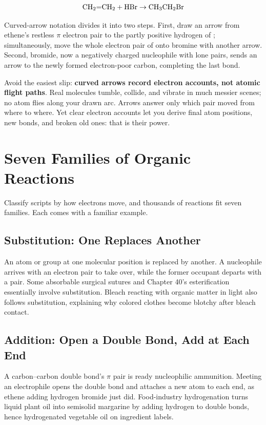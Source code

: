 \[\mathrm{CH_2{=}CH_2} + \mathrm{HBr} \rightarrow \mathrm{CH_3CH_2Br}\]

Curved-arrow notation divides it into two steps. First, draw an arrow from ethene's restless $\pi$ electron pair to the partly positive hydrogen of ; simultaneously, move the whole electron pair of  onto bromine with another arrow. Second, bromide, now a negatively charged nucleophile with lone pairs, sends an arrow to the newly formed electron-poor carbon, completing the last bond.

Avoid the easiest slip: \textbf{curved arrows record electron accounts, not atomic flight paths}. Real molecules tumble, collide, and vibrate in much messier scenes; no atom flies along your drawn arc. Arrows answer only which pair moved from where to where. Yet clear electron accounts let you derive final atom positions, new bonds, and broken old ones: that is their power.

\section{Seven Families of Organic Reactions}

Classify scripts by how electrons move, and thousands of reactions fit seven families. Each comes with a familiar example.

\subsection{Substitution: One Replaces Another}

An atom or group at one molecular position is replaced by another. A nucleophile arrives with an electron pair to take over, while the former occupant departs with a pair. Some absorbable surgical sutures and Chapter 40's esterification essentially involve substitution. Bleach reacting with organic matter in light also follows substitution, explaining why colored clothes become blotchy after bleach contact.

\subsection{Addition: Open a Double Bond, Add at Each End}

A carbon--carbon double bond's $\pi$ pair is ready nucleophilic ammunition. Meeting an electrophile opens the double bond and attaches a new atom to each end, as ethene adding hydrogen bromide just did. Food-industry hydrogenation turns liquid plant oil into semisolid margarine by adding hydrogen to double bonds, hence hydrogenated vegetable oil on ingredient labels.

